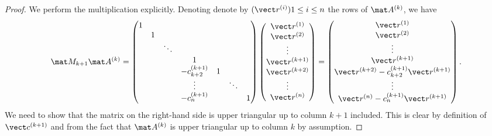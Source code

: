\begin{proof}
    We perform the multiplication explicitly.
    Denoting denote by $(\vect r^{(i)}){1 \leq i \leq n}$ the rows of $\mat A^{(k)}$,
    we have
    \[
        \mat M_{k + 1} \mat A^{(k)}
        =
        \begin{pmatrix}
                1   \\
          & 1  \\
          & &  \ddots \\
          & & & 1 & & & \\
          & & & - c^{(k+1)}_{k+2} & 1  \\
          & & & \vdots & & \ddots \\
          & & & - c^{(k+1)}_n & & & 1 \\
        \end{pmatrix}
        \begin{pmatrix}
            \vect r^{(1)} \\
            \vect r^{(2)} \\
            \vdots \\
            \vect r^{(k+1)} \\
            \vect r^{(k+2)} \\
            \vdots \\
            \vect r^{(n)}
        \end{pmatrix}
        =
        \begin{pmatrix}
            \vect r^{(1)} \\
            \vect r^{(2)} \\
            \vdots \\
            \vect r^{(k+1)} \\
            \vect r^{(k+2)} - c^{(k+1)}_{k+2} \vect r^{(k+1)} \\
            \vdots \\
            \vect r^{(n)} - c^{(k+1)}_{n} \vect r^{(k+1)}
        \end{pmatrix}.
    \]
    We need to show that the matrix on the right-hand side is upper triangular up to column $k+1$ included.
    This is clear by definition of $\vect c^{(k+1)}$ and from the fact that $\mat A^{(k)}$ is upper triangular up to column $k$ by assumption.
\end{proof}

